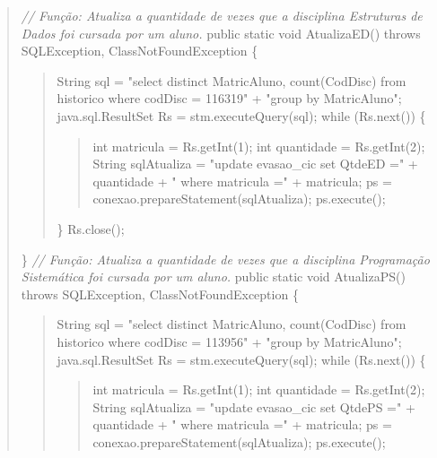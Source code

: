 \begin{quote}
	\textit{// Função: Atualiza a quantidade de vezes que a disciplina Estruturas de Dados foi cursada por um aluno.} \newline
	public static void AtualizaED() throws SQLException, ClassNotFoundException \{
	\begin{quote}
		String sql = "select distinct MatricAluno, count(CodDisc) from historico where codDisc = 116319" \newline
		+ "group by MatricAluno"; \newline
		java.sql.ResultSet Rs = stm.executeQuery(sql); \newline
		while (Rs.next()) \{
		\begin{quote}
			int matricula = Rs.getInt(1); \newline
			int quantidade =  Rs.getInt(2); \newline
			String sqlAtualiza = "update evasao\_cic set QtdeED =" + quantidade + " where matricula =" + matricula; \newline
			ps = conexao.prepareStatement(sqlAtualiza); \newline
			ps.execute();
		\end{quote}
		\} \newline
		Rs.close();
	\end{quote}
	\}\newline
	\newline
	\textit{// Função: Atualiza a quantidade de vezes que a disciplina Programação Sistemática foi cursada por um aluno.} \newline
	public static void AtualizaPS() throws SQLException, ClassNotFoundException \{
	\begin{quote}
		String sql = "select distinct MatricAluno, count(CodDisc) from historico where codDisc = 113956" \newline
		+ "group by MatricAluno"; \newline
		java.sql.ResultSet Rs = stm.executeQuery(sql); \newline
		while (Rs.next()) \{
		\begin{quote}
			int matricula = Rs.getInt(1); \newline
			int quantidade =  Rs.getInt(2); \newline
			String sqlAtualiza = "update evasao\_cic set QtdePS =" + quantidade + " where matricula =" + matricula; \newline
			ps = conexao.prepareStatement(sqlAtualiza); \newline
			ps.execute();
		\end{quote}

\end{quote}
\end{quote}
